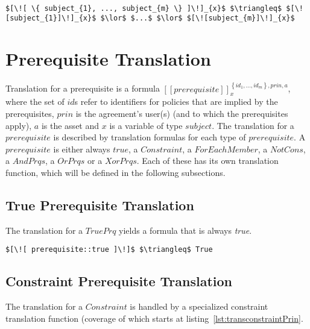 \lstset{mathescape, language=AST}  
\begin{lstlisting}[frame=single, caption={Prin Translation {$\colon$} List of subjects},label={lst:transprinListOfSubjects}]

$[\![ \{ subject_{1}, ..., subject_{m} \} ]\!]_{x}$ $\triangleq$ $[\![subject_{1}]\!]_{x}$ $\lor$ $...$ $\lor$ $[\![subject_{m}]\!]_{x}$

\end{lstlisting}




\section{Prerequisite Translation}

Translation for a prerequisite is a formula $[\![prerequisite]\!]^{\left\{ {id_{1}, ..., id_{m}}\right\}, prin, a}_{x}$, where the set of $id$s refer to identifiers for policies that are implied by the prerequisites, $prin$ is the agreement's user(s) (and to which the prerequisites apply), $a$ is the asset and $x$ is a variable of type $subject$. The translation for a $prerequisite$ is described by translation formulas for each type of $prerequisite$. A $prerequisite$ is either always $true$, a $Constraint$, a $ForEachMember$, a $NotCons$, a $AndPrqs$, a $OrPrqs$ or a $XorPrqs$. Each of these has its own translation function, which will be defined in the following subsections.

\subsection{True Prerequisite Translation}
The translation for a $TruePrq$ yields a formula that is always \emph{true}.

\lstset{mathescape, language=AST}  
\begin{lstlisting}[frame=single, caption={Prerequisite Translation {$\colon$} Always True Prerequisite},label={lst:transpreRequisiteTruePrq}]
	$[\![ prerequisite::true ]\!]$ $\triangleq$ True
\end{lstlisting}

\subsection{Constraint Prerequisite Translation}
The translation for a $Constraint$ is handled by a specialized constraint translation function (coverage of which starts at listing~\ref{lst:transconstraintPrin}.

